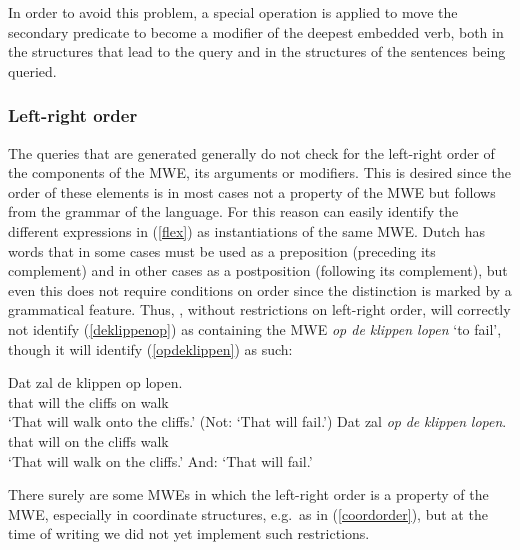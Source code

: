 \documentclass[output=paper,colorlinks,citecolor=brown]{langscibook}
\begin{document}
In order to avoid this problem, a special operation is applied to move the secondary predicate to become a modifier of the deepest embedded verb, both in the structures that lead to the query and in the structures of the sentences being queried.


\subsubsection{Left-right order}
\label{order}

The queries that are generated generally do not check for the left-right order of the components of the MWE, its arguments or modifiers. This is desired since the order of these elements is in most cases not a property of the MWE but follows from the grammar of the language. For this reason {\mwefinder} can easily identify the different expressions in (\ref{flex}) as instantiations of the same MWE. Dutch has words that in some cases must be used as a preposition (preceding its complement) and in other cases as a postposition (following its complement), but even this does not require conditions on order since the distinction is marked by a grammatical feature. Thus, {\mwefinder}, without restrictions on left-right order,  will correctly not identify (\ref{deklippenop}) as containing the MWE \textit{op de klippen lopen} `to fail', though it will  identify (\ref{opdeklippen}) as such: 

\begin{exe}
\ex \gll Dat zal de klippen op lopen.\\
that will the cliffs on walk\\ \label{deklippenop}
\glt `That will walk onto the cliffs.' (Not: `That will fail.')
\ex \gll Dat zal \textit{op} \textit{de} \textit{klippen} \textit{lopen}.\\
that will on the cliffs walk\\ \label{opdeklippen}
\glt `That will walk on the cliffs.' And: `That will fail.'
 \end{exe}

There surely are some MWEs in which the left-right order is a property of the MWE, especially in coordinate structures, e.g.\ as in (\ref{coordorder}), but at the time of writing we did not yet implement such restrictions.

\begin{exe}
\ex \label{coordorder}
\begin{xlist}

\end{xlist}
\end{exe}
\end{document}
